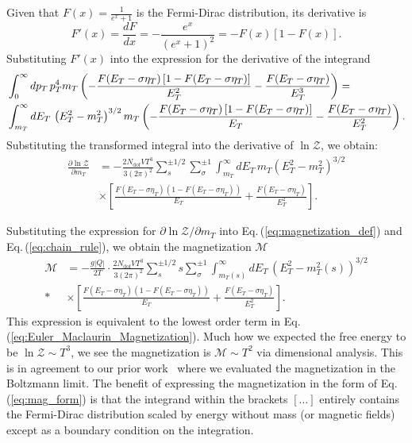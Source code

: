 \documentclass[epjST]{svjour}
\newcommand{\req}[1]{Eq.\,(\ref{#1})}
\numberwithin{equation}{section}
\begin{document}
Given that \( F(x) = \frac{1}{e^{x} + 1} \) is the Fermi-Dirac distribution, its derivative is
\begin{equation}
F'(x) = \frac{dF}{dx} = -\frac{e^{x}}{(e^{x} + 1)^2} = -F(x)\left[1 - F(x)\right].
\end{equation}
Substituting \( F'(x) \) into the expression for the derivative of the integrand
\begin{align}
    \notag
    &\int_{0}^{\infty} dp_{T} \, p_{T}^{4} m_{T} \left( -\frac{F(E_{T} - \sigma\eta_{T})\left[1 - F(E_{T} - \sigma\eta_{T})\right]}{E_{T}^{2}} - \frac{F(E_{T} - \sigma\eta_{T})}{E_{T}^{3}} \right) =\\*
    &\int_{m_{T}}^{\infty} dE_{T} \, \left(E_{T}^{2} - m_{T}^{2}\right)^{3/2} m_{T} \left( -\frac{F(E_{T} - \sigma\eta_{T})\left[1 - F(E_{T} - \sigma\eta_{T})\right]}{E_{T}} - \frac{F(E_{T} - \sigma\eta_{T})}{E_{T}^{2}} \right).
\end{align}
Substituting the transformed integral into the derivative of \(\ln \mathcal{Z}\), we obtain:
\begin{align}
    \frac{\partial \ln \mathcal{Z}}{\partial m_{T}} &= -\frac{2 N_{\mathrm{dof}} V T^{3}}{3 (2\pi)^{2}} \sum_{s}^{\pm1/2}\sum_{\sigma}^{\pm1} \int_{m_{T}}^{\infty} dE_{T} \, m_{T}\left(E_{T}^{2} - m_{T}^{2}\right)^{3/2}\\
    &\times\left[ \frac{F(E_{T} - \sigma\eta_{T})\left(1 - F(E_{T} - \sigma\eta_{T})\right)}{E_{T}} + \frac{F(E_{T} - \sigma\eta_{T})}{E_{T}^{2}} \right].
\end{align}

Substituting the expression for \(\partial \ln \mathcal{Z}/\partial m_{T}\) into \req{eq:magnetization_def} and \req{eq:chain_rule}, we obtain the magnetization \(\mathcal{M}\)
\begin{align}
    \label{eq:mag_form}
    \mathcal{M} &= -\frac{g|Q|}{2 T}\cdot\frac{2 N_{\mathrm{dof}} V T^{3}}{3 (2\pi)^{2}} \sum_{s}^{\pm1/2} s \sum_{\sigma}^{\pm1} \int_{m_{T}(s)}^{\infty} dE_{T} \, \left(E_{T}^{2} - m_{T}^{2}(s)\right)^{3/2} \\*
    &\times\left[ \frac{F(E_{T} - \sigma\eta_{T})\left(1 - F(E_{T} - \sigma\eta_{T})\right)}{E_{T}} + \frac{F(E_{T} - \sigma\eta_{T})}{E_{T}^{2}} \right].
\end{align}
This expression is equivalent to the lowest order term in \req{eq:Euler_Maclaurin_Magnetization}. Much how we expected the free energy to be \(\ln\mathcal{Z}\sim T^{3}\), we see the magnetization is \(\mathcal{M}\sim T^{2}\) via dimensional analysis. This is in agreement to our prior work~\cite{Steinmetz:2023nsc,Steinmetz:2023ucp,Rafelski:2024fej} where we evaluated the magnetization in the Boltzmann limit. The benefit of expressing the magnetization in the form of \req{eq:mag_form} is that the integrand within the brackets \([\ldots]\) entirely contains the Fermi-Dirac distribution scaled by energy without mass (or magnetic fields) except as a boundary condition on the integration.
\end{document}
